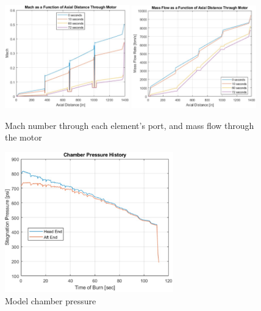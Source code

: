 \begin{figure}[p]
    \centering
    \includegraphics[width=0.48\textwidth]{images/mach-through-motor}
    \hfill
    \includegraphics[width=0.48\textwidth]{images/massflow-through-motor}
    \caption{Mach number through each element's port, and mass flow through the motor}
    \label{figure:mach-through-motor}
\end{figure}

\begin{figure}[p]
    \centering
    \includegraphics[width=0.65\textwidth]{images/combustion-chamber-pressure}
    \caption{Model chamber pressure}
    \label{figure:model-chamber-pressure}
\end{figure}


